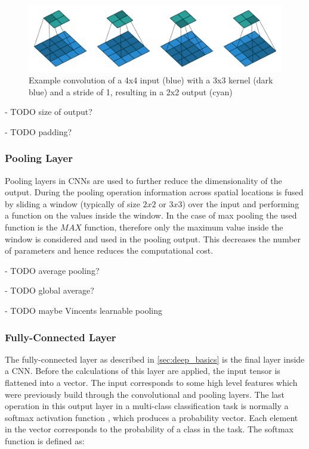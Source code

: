 \begin{figure}
\begin{center}
    \includegraphics[width=16cm]{imgs/conv_example_full.png}
    \caption{Example convolution of a 4x4 input (blue) with a 3x3 kernel (dark blue) and a stride of 1, resulting in a 2x2 output (cyan) \cite{conv_arithmetic}}
    \label{fig:conv_example}
\end{center}
\end{figure}

- TODO size of output?

- TODO padding?

\subsubsection{Pooling Layer}
Pooling layers in \acp{CNN} are used to further reduce the dimensionality of the output.
During the pooling operation information across spatial locations is fused by sliding a window (typically of size $2x2$ or $3x3$) over the input and performing a function on the values inside the window.
In the case of max pooling the used function is the $MAX$ function, therefore only the maximum value inside the window is considered and used in the pooling output.
This decreases the number of parameters and hence reduces the computational cost. \cite{dl}

- TODO average pooling?

- TODO global average?

- TODO maybe Vincents learnable pooling

\subsubsection{Fully-Connected Layer}
The fully-connected layer as described in \ref{sec:deep_basics} is the final layer inside a \ac{CNN}.
Before the calculations of this layer are applied, the input tensor is flattened into a vector.
The input corresponds to some high level features which were previously build through the convolutional and pooling layers.
The last operation in this output layer in a multi-class classification task is normally a softmax activation function \cite{softmax}, which produces a probability vector.
Each element in the vector corresponds to the probability of a class in the task.
The softmax function is defined as:

